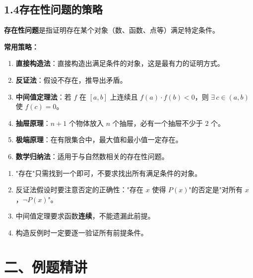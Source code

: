 \documentclass[12pt, a4paper]{ctexart}
\begin{document}
\subsection*{1.4\quad 存在性问题的策略}

\begin{knowledgebox}[存在性问题]
\textbf{存在性问题}是指证明存在某个对象（数、函数、点等）满足特定条件。

\medskip
\textbf{常用策略：}
\begin{enumerate}[label=(\arabic*)]
  \item \textbf{直接构造法}：直接构造出满足条件的对象，这是最有力的证明方式。
  \item \textbf{反证法}：假设不存在，推导出矛盾。
  \item \textbf{中间值定理法}：若 $f$ 在 $[a,b]$ 上连续且 $f(a) \cdot f(b) < 0$，则 $\exists\, c \in (a,b)$ 使 $f(c) = 0$。
  \item \textbf{抽屉原理}：$n+1$ 个物体放入 $n$ 个抽屉，必有一个抽屉不少于 $2$ 个。
  \item \textbf{极端原理}：在有限集合中，最大值和最小值一定存在。
  \item \textbf{数学归纳法}：适用于与自然数相关的存在性问题。
\end{enumerate}
\end{knowledgebox}

\begin{warnbox}[易错提醒]
\begin{enumerate}[label=(\arabic*)]
  \item "存在"只需找到一个即可，不要求找出所有满足条件的对象。
  \item 反证法假设时要注意否定的正确性："存在 $x$ 使得 $P(x)$"的否定是"对所有 $x$，$\lnot P(x)$"。
  \item 中间值定理要求函数\textbf{连续}，不能遗漏此前提。
  \item 构造反例时一定要逐一验证所有前提条件。
\end{enumerate}
\end{warnbox}

\section*{\textcolor{examorange}{二、例题精讲}}
\end{document}
